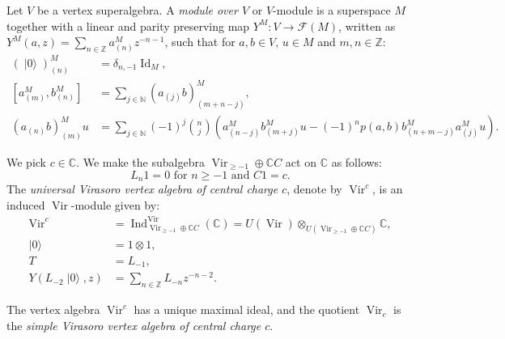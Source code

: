 \documentclass{beamer}
\DeclareMathOperator{\Vir}{Vir}
\DeclareMathOperator{\Id}{Id}
\DeclareMathOperator{\Ind}{Ind}
\DeclareMathOperator{\vac}{|0\rangle}
\begin{document}
\begin{frame}

  Let $V$ be a vertex superalgebra.
  A \emph{module over $V$} or $V$-module is a superspace $M$ together with a linear and parity preserving map $Y^M: V \to \mathcal{F}(M)$, written as $Y^M(a, z) = \sum_{n \in \mathbb{Z}}a^M_{(n)}z^{-n - 1}$, such that for $a, b \in V$, $u \in M$ and $m, n \in \mathbb{Z}$:
  \begin{align*}
    (\vac)^M_{(n)} &= \delta_{n, -1}\Id_M, \\
    [a^M_{(m)}, b^M_{(n)}] &= \sum_{j \in \mathbb{N}}(a_{(j)}b)^M_{(m + n - j)}, \\
    (a_{(n)}b)^M_{(m)}u &= \sum_{j \in \mathbb{N}}(-1)^j\binom{n}{j}(a^M_{(n - j)}b^M_{(m + j)}u - (-1)^np(a, b)b^M_{(n + m - j)}a^M_{(j)}u).
  \end{align*}

\end{frame}

\begin{frame}

  \begin{example}
    \label{exa:1}
    We pick $c \in \mathbb{C}$.
    We make the subalgebra $\Vir_{\ge -1} \oplus \mathbb{C}C$ act on $\mathbb{C}$ as follows:
    \begin{equation*}
      \text{$L_n1 = 0$ for $n \ge -1$ and $C1 = c$}.
    \end{equation*}
    The \emph{universal Virasoro vertex algebra of central charge $c$}, denote by $\Vir^c$, is an induced $\Vir$-module given by:
    \begin{align*}
      \Vir^c &= \Ind^{\Vir}_{\Vir_{\ge -1} \oplus \mathbb{C}C}(\mathbb{C}) = U(\Vir) \otimes_{U(\Vir_{\ge -1} \oplus \mathbb{C}C)} \mathbb{C}, \\
      \vac &= 1\otimes1, \\
      T &= L_{-1}, \\
      Y(L_{-2}\vac, z) &= \sum_{n \in \mathbb{Z}}L_{-n}z^{-n - 2}.
    \end{align*}

    The vertex algebra $\Vir^c$ has a unique maximal ideal, and the quotient $\Vir_c$ is the \emph{simple Virasoro vertex algebra of central charge $c$}.
  \end{example}

\end{frame}
\end{document}
